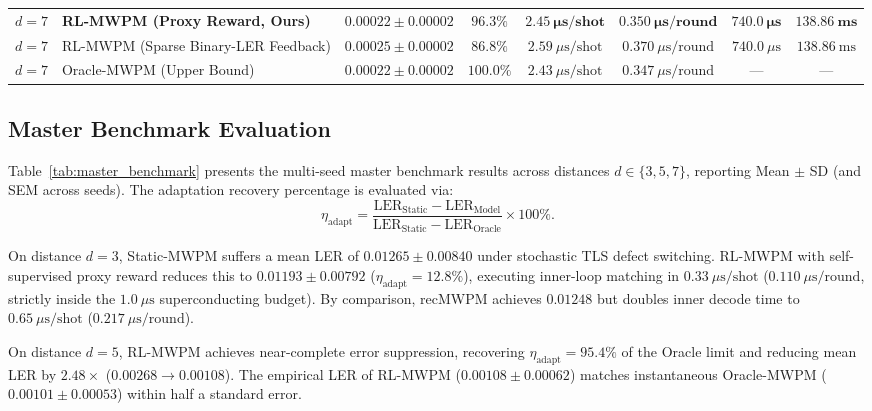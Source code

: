 \documentclass[aps,prxquantum,reprint,superscriptaddress,floatfix,nofootinbib]{revtex4-2}
\begin{document}
\begin{table}[t]
{\begin{tabular}{llcccccc}
$d=7$ & \textbf{RL-MWPM (Proxy Reward, Ours)} & $\mathbf{0.00022 \pm 0.00002}$ & $\mathbf{96.3\%}$ & $\mathbf{2.45\ \mu\text{s}/\text{shot}}$ & $\mathbf{0.350\ \mu\text{s}/\text{round}}$ & $\mathbf{740.0\ \mu\text{s}}$ & $\mathbf{138.86\ \text{ms}}$ \\
$d=7$ & RL-MWPM (Sparse Binary-LER Feedback) & $0.00025 \pm 0.00002$ & $86.8\%$ & $2.59\ \mu\text{s}/\text{shot}$ & $0.370\ \mu\text{s}/\text{round}$ & $740.0\ \mu\text{s}$ & $138.86\ \text{ms}$ \\
$d=7$ & Oracle-MWPM (Upper Bound) & $0.00022 \pm 0.00002$ & $100.0\%$ & $2.43\ \mu\text{s}/\text{shot}$ & $0.347\ \mu\text{s}/\text{round}$ & --- & --- \\
\bottomrule
\end{tabular}%
}
\end{table}

\subsection{Master Benchmark Evaluation}
Table~\ref{tab:master_benchmark} presents the multi-seed master benchmark results across distances $d \in \{3, 5, 7\}$, reporting Mean $\pm$ SD (and SEM across seeds). The adaptation recovery percentage is evaluated via:
\begin{equation}
    \eta_{\text{adapt}} = \frac{\text{LER}_{\text{Static}} - \text{LER}_{\text{Model}}}{\text{LER}_{\text{Static}} - \text{LER}_{\text{Oracle}}} \times 100\%.
    \label{eq:eta_adapt_def}
\end{equation}

On distance $d=3$, Static-MWPM suffers a mean LER of $0.01265 \pm 0.00840$ under stochastic TLS defect switching. RL-MWPM with self-supervised proxy reward reduces this to $0.01193 \pm 0.00792$ ($\eta_{\text{adapt}} = 12.8\%$), executing inner-loop matching in $0.33\ \mu\text{s}/\text{shot}$ ($0.110\ \mu\text{s}/\text{round}$, strictly inside the $1.0\ \mu\text{s}$ superconducting budget). By comparison, recMWPM achieves $0.01248$ but doubles inner decode time to $0.65\ \mu\text{s}/\text{shot}$ ($0.217\ \mu\text{s}/\text{round}$).

On distance $d=5$, RL-MWPM achieves near-complete error suppression, recovering $\eta_{\text{adapt}} = \mathbf{95.4\%}$ of the Oracle limit and reducing mean LER by $2.48\times$ ($0.00268 \to 0.00108$). The empirical LER of RL-MWPM ($0.00108 \pm 0.00062$) matches instantaneous Oracle-MWPM ($0.00101 \pm 0.00053$) within half a standard error.
\end{document}

